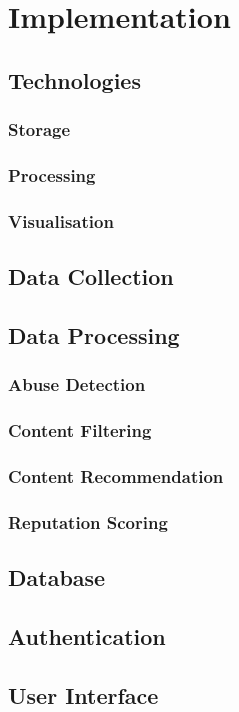 \chapter{Implementation}
\label{Chapter:Implementation}

\section{Technologies}
\subsection{Storage}
\subsection{Processing}
\subsection{Visualisation}

\section{Data Collection}

\section{Data Processing}
\subsection{Abuse Detection}
\subsection{Content Filtering}
\subsection{Content Recommendation}
\subsection{Reputation Scoring}

\section{Database}

\section{Authentication}

\section{User Interface}

